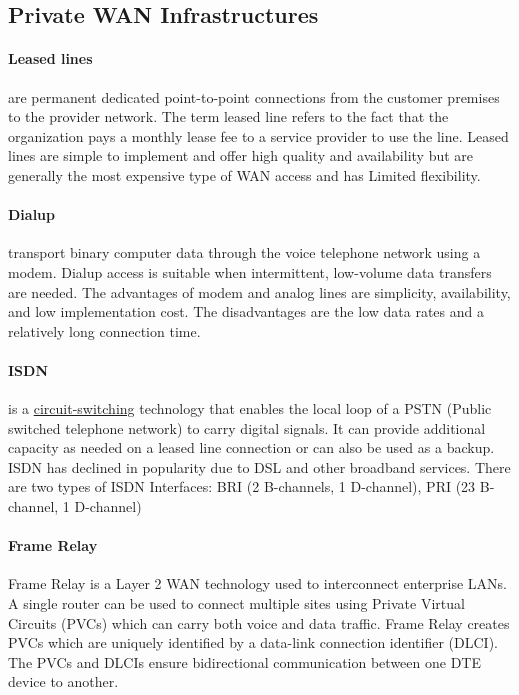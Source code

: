 \subsection{Private WAN Infrastructures}

\paragraph{Leased lines} are permanent dedicated point-to-point connections from the customer premises to the provider network. The term leased line refers to the fact that the organization pays a monthly lease fee to a service provider to use the line. Leased lines are simple to implement and offer high quality and availability but are generally the most expensive type of WAN access and has Limited flexibility.

\paragraph{Dialup}transport binary computer data through the voice telephone network using a modem. Dialup access is suitable when intermittent, low-volume data transfers are needed. The advantages of modem and analog lines are simplicity, availability, and low implementation cost. The disadvantages are the low data rates and a relatively long connection time. 

\paragraph{ISDN}is a \underline{circuit-switching} technology that enables the local loop of a PSTN (Public switched telephone network) to carry digital signals. It can provide additional capacity as needed on a leased line connection or can also be used as a backup. ISDN has declined in popularity due to DSL and other broadband services. There are two types of ISDN Interfaces: BRI (2 B-channels, 1 D-channel), PRI (23 B-channel, 1 D-channel)

\paragraph{Frame Relay}Frame Relay is a Layer 2 WAN technology used to interconnect enterprise LANs. A single router can be used to connect multiple sites using Private Virtual Circuits (PVCs) which can carry both voice and data traffic. Frame Relay creates PVCs which are uniquely identified by a data-link connection identifier (DLCI). The PVCs and DLCIs ensure bidirectional communication between one DTE device to another.

